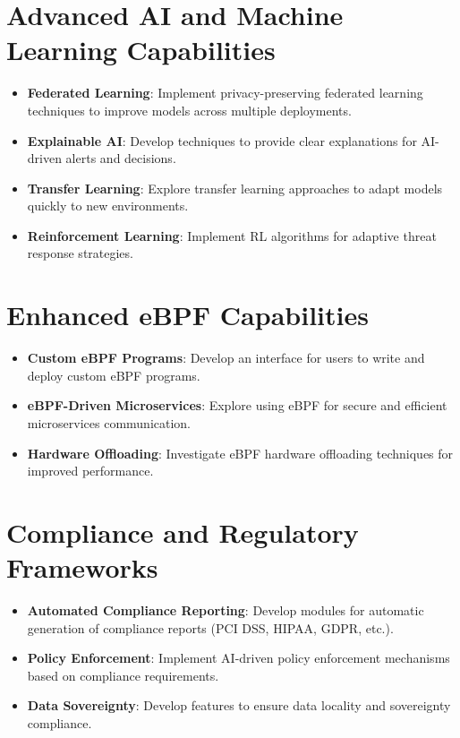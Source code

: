 \section{Advanced AI and Machine Learning Capabilities}
\begin{itemize}
    \item \textbf{Federated Learning}: Implement privacy-preserving federated learning techniques to improve models across multiple deployments.
    \item \textbf{Explainable AI}: Develop techniques to provide clear explanations for AI-driven alerts and decisions.
    \item \textbf{Transfer Learning}: Explore transfer learning approaches to adapt models quickly to new environments.
    \item \textbf{Reinforcement Learning}: Implement RL algorithms for adaptive threat response strategies.
\end{itemize}

\section{Enhanced eBPF Capabilities}
\begin{itemize}
    \item \textbf{Custom eBPF Programs}: Develop an interface for users to write and deploy custom eBPF programs.
    \item \textbf{eBPF-Driven Microservices}: Explore using eBPF for secure and efficient microservices communication.
    \item \textbf{Hardware Offloading}: Investigate eBPF hardware offloading techniques for improved performance.
\end{itemize}

\section{Compliance and Regulatory Frameworks}
\begin{itemize}
    \item \textbf{Automated Compliance Reporting}: Develop modules for automatic generation of compliance reports (PCI DSS, HIPAA, GDPR, etc.).
    \item \textbf{Policy Enforcement}: Implement AI-driven policy enforcement mechanisms based on compliance requirements.
    \item \textbf{Data Sovereignty}: Develop features to ensure data locality and sovereignty compliance.
\end{itemize}

